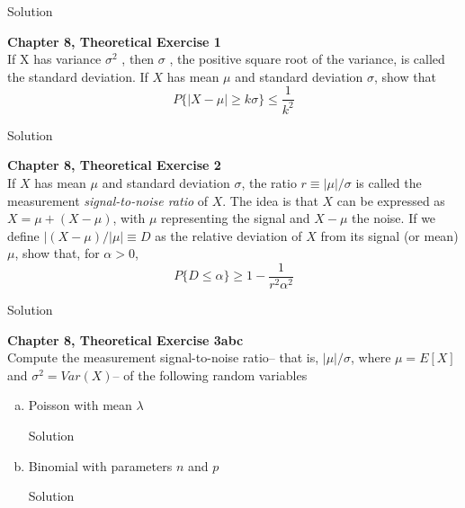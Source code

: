 \documentclass{article}
\begin{document}
\begin{spacing}{1.1}
\begin{homeworkProblem}
\begin{homeworkSection}{Solution}
  \end{homeworkSection}
\end{homeworkProblem}

\newpage
\begin{homeworkProblem}
  {\bf Chapter 8, Theoretical Exercise 1}\\
  If X has variance $\sigma^2$ , then $\sigma$ , the positive square root 
  of the variance, is called the standard deviation. If $X$ has mean $\mu$ 
  and standard deviation $\sigma$, show that
    \[P\{ |X - \mu| \ge k \sigma \} \le \frac{ 1}{ k^2}\]
  \begin{homeworkSection}{Solution}
    
  \end{homeworkSection}
\end{homeworkProblem}

\newpage
\begin{homeworkProblem}
  {\bf Chapter 8, Theoretical Exercise 2}\\
  If $X$ has mean $\mu$ and standard deviation $\sigma$, the ratio 
  $r \equiv |\mu|/\sigma$ is called the measurement \emph{signal-to-noise ratio} 
  of $X$. The idea is that $X$ can be expressed as $X = \mu + (X − \mu)$, with $\mu$ 
  representing the signal and $X − \mu$ the noise. If we define 
  $|(X − \mu)/|\mu| \equiv D$ as the relative deviation of $X$ from its signal 
  (or mean) $\mu$, show that, for $\alpha > 0$,
    \[P\{ D \le \alpha\} \ge 1 - \frac{ 1}{ r^2 \alpha^2}\]
  \begin{homeworkSection}{Solution}
    
  \end{homeworkSection}
\end{homeworkProblem}

\newpage
\begin{homeworkProblem}
  {\bf Chapter 8, Theoretical Exercise 3abc}\\
  Compute the measurement signal-to-noise ratio--
  that is, $|\mu|/\sigma$, where $\mu = E[ X]$ and $\sigma^2 = Var( X)$--
  of the following random variables
  \begin{enumerate}[(a)]
    \item Poisson with mean $\lambda$
      \begin{homeworkSection}{Solution}
      
      \end{homeworkSection}
    \item Binomial with parameters $n$ and $p$
      \begin{homeworkSection}{Solution}
      

\end{homeworkSection}
\end{enumerate}
\end{homeworkProblem}
\end{spacing}
\end{document}
